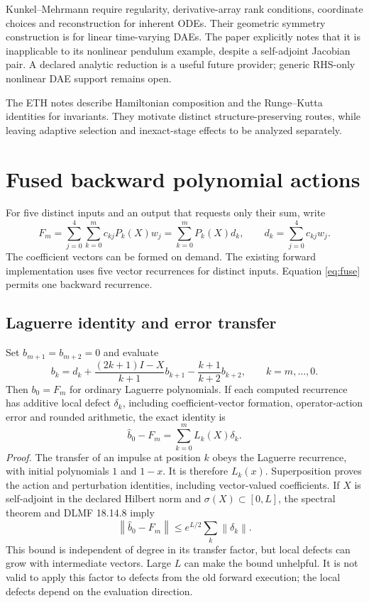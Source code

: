 \documentclass[aps,pra,reprint,onecolumn,11pt,notitlepage,nofootinbib]{revtex4-2}
\newcommand{\norm}[1]{\left\|#1\right\|}
\begin{document}
Kunkel--Mehrmann require regularity, derivative-array rank conditions,
coordinate choices and reconstruction for inherent ODEs\cite{dae}. Their
geometric symmetry construction is for linear time-varying DAEs. The paper
explicitly notes that it is inapplicable to its nonlinear pendulum example,
despite a self-adjoint Jacobian pair. A declared analytic reduction is a
useful future provider; generic RHS-only nonlinear DAE support remains open.

The ETH notes describe Hamiltonian composition and the Runge--Kutta
identities for invariants\cite{eth}. They motivate distinct structure-preserving
routes, while leaving adaptive selection and inexact-stage effects to be
analyzed separately.

\section{Fused backward polynomial actions}
For five distinct inputs and an output that requests only their sum, write
\begin{equation}
 F_m=\sum_{j=0}^{4}\sum_{k=0}^{m}c_{kj}P_k(X)w_j
     =\sum_{k=0}^{m}P_k(X)d_k,
 \qquad d_k=\sum_{j=0}^{4}c_{kj}w_j .
 \label{eq:fuse}
\end{equation}
The coefficient vectors can be formed on demand. The existing forward
implementation uses five vector recurrences for distinct inputs. Equation
\eqref{eq:fuse} permits one backward recurrence.

\subsection{Laguerre identity and error transfer}
Set $b_{m+1}=b_{m+2}=0$ and evaluate
\begin{equation}
 b_k=d_k+\frac{(2k+1)I-X}{k+1}b_{k+1}
           -\frac{k+1}{k+2}b_{k+2},\qquad k=m,\ldots,0.
 \label{eq:lag}
\end{equation}
Then $b_0=F_m$ for ordinary Laguerre polynomials. If each computed recurrence
has additive local defect $\delta_k$, including coefficient-vector formation,
operator-action error and rounded arithmetic, the exact identity is
\begin{equation}
 \widehat b_0-F_m=\sum_{k=0}^{m}L_k(X)\delta_k.
 \label{eq:lagdef}
\end{equation}
\textit{Proof.} The transfer of an impulse at position $k$ obeys the
Laguerre recurrence, with initial polynomials $1$ and $1-x$. It is therefore
$L_k(x)$. Superposition proves the action and perturbation identities,
including vector-valued coefficients. If $X$ is self-adjoint in the declared
Hilbert norm and $\sigma(X)\subset[0,L]$, the spectral theorem and DLMF
18.14.8\cite{dlmf} imply
\begin{equation}
 \norm{\widehat b_0-F_m}\le e^{L/2}\sum_k\norm{\delta_k}.
 \label{eq:lagbound}
\end{equation}
This bound is independent of degree in its transfer factor, but local
defects can grow with intermediate vectors. Large $L$ can make the bound
unhelpful. It is not valid to apply this factor to defects from the old
forward execution; the local defects depend on the evaluation direction.
\end{document}
